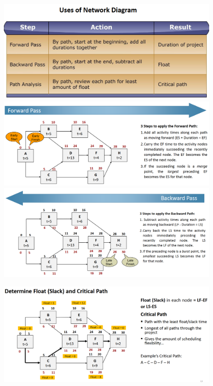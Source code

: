 \documentclass[]{project_plan}
\begin{document}
\begin{figure}[h!]
  \centering
  \includegraphics[width=\linewidth]{uses_of_network_diagram.png}
  \includegraphics[width=\linewidth]{network_diagram_forward_pass.png}
  \includegraphics[width=\linewidth]{network_diagram_backward_pass.png}
\end{figure}

\newpage

\begin{figure}[h!]
  \centering
  \includegraphics[width=\linewidth]{network_diagram_float.png}
\end{figure}
\end{document}
